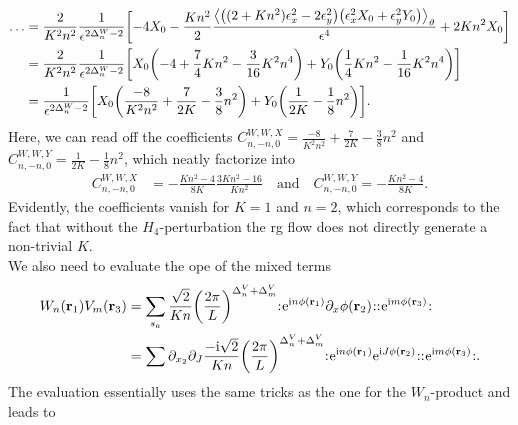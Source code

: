 \begin{align*}
\dots &= \frac{2}{K^2n^2} \frac{1}{\epsilon^{2\Delta^W_n - 2}} \klb[\bigg]{-4 X_0 - \frac{Kn^2}{2} \frac{\bra*{\kla*{(2+Kn^2)\epsilon_x^2 - 2\epsilon_y^2} \kla*{\epsilon_x^2 X_0 + \epsilon_y^2 Y_0}}_\vartheta}{\epsilon^4} + 2Kn^2 X_0}\\
&= \frac{2}{K^2n^2} \frac{1}{\epsilon^{2\Delta^W_n - 2}} \klb*{X_0 \kla*{-4 + \frac{7}{4}Kn^2 - \frac{3}{16} K^2n^4} + Y_0 \kla*{\frac{1}{4}Kn^2 - \frac{1}{16}K^2n^4}}\\
&= \frac{1}{\epsilon^{2\Delta^W_n - 2}} \klb*{X_0 \kla*{\frac{-8}{K^2n^2} + \frac{7}{2K} - \frac{3}{8} n^2} + Y_0 \kla*{\frac{1}{2K} - \frac{1}{8}n^2}}.
\end{align*}
Here, we can read off the coefficients $C^{W,W,X}_{n,-n,0} = \frac{-8}{K^2n^2} + \frac{7}{2K} - \frac{3}{8} n^2$ and $C^{W,W,Y}_{n,-n,0} = \frac{1}{2K} - \frac{1}{8}n^2$, which neatly factorize into
\begin{align*}
C^{W,W,X}_{n,-n,0} &= - \frac{Kn^2-4}{8K} \frac{3Kn^2 - 16}{Kn^2} \quad\text{and} \quad C^{W,W,Y}_{n,-n,0} = - \frac{Kn^2-4}{8K}.
\end{align*}
Evidently, the coefficients vanish for $K=1$ and $n=2$, which corresponds to the fact that without the $H_4$-perturbation the \gls{rg} flow does not directly generate a non-trivial $K$.\\
We also need to evaluate the \gls{ope} of the mixed terms
\begin{align*}
W_n(\textbf{r}_1) V_m(\textbf{r}_3) &= \sum_{s_a} \frac{\sqrt{2}}{Kn} \kla*{\frac{2\pi}{L}}^{\Delta^V_n + \Delta^V_m} \normord{\powe{\i n\phi(\textbf{r}_1)} \partial_x\phi(\textbf{r}_2)} \normord{\powe{\i m\phi(\textbf{r}_3)}}\\
&= \sum \partial_{x_2} \partial_J \frac{-\i \sqrt{2}}{Kn} \kla*{\frac{2\pi}{L}}^{\Delta^V_n + \Delta^V_m} \normord{\powe{\i n\phi(\textbf{r}_1)} \powe{\i J\phi(\textbf{r}_2)}} \normord{\powe{\i m\phi(\textbf{r}_3)}}.
\end{align*}
The evaluation essentially uses the same tricks as the one for the $W_n$-product and leads to
